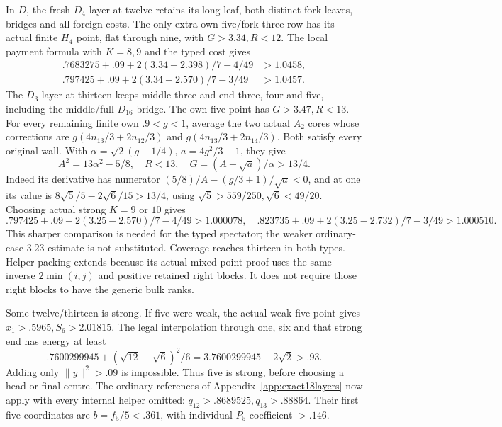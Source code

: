 \documentclass[11pt]{article}
\theoremstyle{definition}
\theoremstyle{remark}
\newcommand{\norm}[1]{\lVert #1\rVert}
\begin{document}
In \(D\), the fresh \(D_4\) layer at twelve retains its long
leaf, both distinct fork leaves, bridges and all foreign costs.
The only extra own-five/fork-three row has its actual finite
\(H_4\) point, flat through nine, with \(G>3.34,R<12\).
The local payment formula with \(K=8,9\) and the typed cost gives
\[
\begin{split}
 .7683275+.09+2(3.34-2.398)/7-4/49&>1.0458,\\
 .797425+.09+2(3.34-2.570)/7-3/49&>1.0457.
\end{split}
\]
The \(D_3\) layer at thirteen keeps middle-three and end-three,
four and five, including the middle/full-\(D_{16}\) bridge.
The own-five point has \(G>3.47,R<13\). For every remaining
finite own \(.9<g<1\), average the two actual \(A_2\) cores
whose corrections are \(g(4n_{13}/3+2n_{12}/3)\) and
\(g(4n_{13}/3+2n_{14}/3)\). Both satisfy every original wall.
With \(\alpha=\sqrt2(g+1/4)\), \(a=4g^2/3-1\), they give
\[
 A^2=13\alpha^2-5/8,\quad R<13,\quad
 G=(A-\sqrt a)/\alpha>13/4.
\]
Indeed its derivative has numerator
\((5/8)/A-(g/3+1)/\sqrt a<0\), and at one its value is
\(8\sqrt5/5-2\sqrt6/15>13/4\), using
\(\sqrt5>559/250,\sqrt6<49/20\).
Choosing actual strong \(K=9\) or \(10\) gives
\[
 .797425+.09+2(3.25-2.570)/7-4/49>1.000078,
\quad .823735+.09+2(3.25-2.732)/7-3/49>1.000510.
\]
This sharper comparison is needed for the typed spectator; the weaker
ordinary-case \(3.23\) estimate is not substituted. Coverage reaches
thirteen in both types. Helper packing extends because its actual
mixed-point proof uses the same inverse \(2\min(i,j)\) and positive
retained right blocks. It does not require those right blocks to have
the generic bulk ranks.

Some twelve/thirteen is strong. If five were weak, the actual
weak-five point gives \(x_1>.5965,S_6>2.01815\). The legal
interpolation through one, six and that strong end has energy at least
\[
 .7600299945+(\sqrt{12}-\sqrt6)^2/6
             =3.7600299945-2\sqrt2>.93.
\]
Adding only \(\norm y^2>.09\) is impossible. Thus five is strong,
before choosing a head or final centre. The ordinary references of
Appendix~\ref{app:exact18layers} now apply with every internal helper
omitted: \(q_{12}>.8689525,q_{13}>.88864\). Their first five
coordinates are \(b=f_5/5<.361\), with individual \(P_5\)
coefficient \(>.146\).
\end{document}
